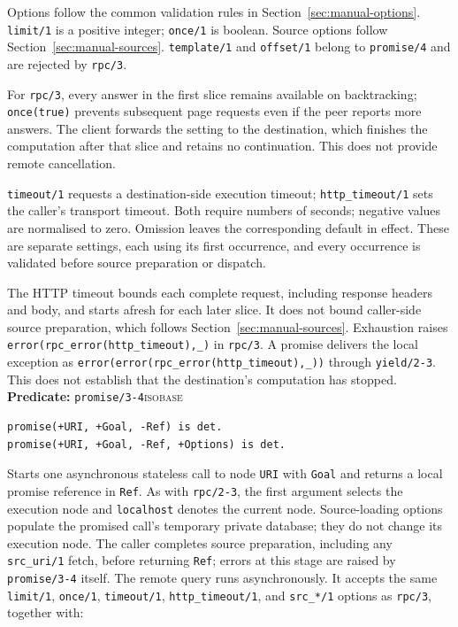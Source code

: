 Options follow the common validation rules in Section~\ref{sec:manual-options}. \texttt{limit/\allowbreak{}1} is a positive integer; \texttt{once/\allowbreak{}1}
is boolean. Source options follow Section~\ref{sec:manual-sources}. \texttt{template/\allowbreak{}1} and
\texttt{offset/\allowbreak{}1} belong to \texttt{promise/\allowbreak{}4} and are rejected by \texttt{rpc/\allowbreak{}3}.

For \texttt{rpc/\allowbreak{}3}, every answer in the first slice remains
available on backtracking; \texttt{once(true)} prevents subsequent page
requests even if the peer reports more answers. The client forwards the
setting to the destination, which finishes the computation after that slice
and retains no continuation. This does not provide remote cancellation.

\texttt{timeout/\allowbreak{}1} requests a destination-side execution timeout;
\texttt{http\_\allowbreak{}timeout/\allowbreak{}1} sets the caller's transport
timeout. Both require numbers of seconds; negative values are normalised to
zero. Omission leaves the corresponding default in effect. These are separate
settings, each using its first occurrence, and every occurrence is validated
before source preparation or dispatch.

The HTTP timeout bounds each complete request, including response headers and
body, and starts afresh for each later slice. It does not bound caller-side
source preparation, which follows Section~\ref{sec:manual-sources}. Exhaustion
raises \texttt{error(rpc\_error(http\_timeout),\_)} in \texttt{rpc/3}. A promise
delivers the local exception as
\texttt{error(error(rpc\_error(http\_timeout),\_))} through \texttt{yield/2-3}.
This does not establish that the destination's computation has stopped.\\

\noindent \textbf{Predicate:} \texttt{promise/\allowbreak{}3-4}\hfill\textsc{isobase}

\begin{verbatim}
promise(+URI, +Goal, -Ref) is det.
promise(+URI, +Goal, -Ref, +Options) is det.
\end{verbatim}

\noindent Starts one asynchronous stateless call to node \texttt{URI} with
\texttt{Goal} and returns a local promise reference in \texttt{Ref}. As with
\texttt{rpc/\allowbreak{}2-3}, the first argument selects the execution node and
\texttt{localhost} denotes the current node. Source-loading options populate
the promised call's temporary private database; they do not change its
execution node. The caller completes source
preparation, including any \texttt{src\_\allowbreak{}uri/\allowbreak{}1} fetch, before returning
\texttt{Ref}; errors at this stage are raised by \texttt{promise/\allowbreak{}3-4}
itself. The remote query runs asynchronously. It accepts the same \texttt{limit/\allowbreak{}1}, \texttt{once/\allowbreak{}1},
\texttt{timeout/\allowbreak{}1}, \texttt{http\_\allowbreak{}timeout/\allowbreak{}1}, and \texttt{src\_\allowbreak{}*/\allowbreak{}1} options as
\texttt{rpc/\allowbreak{}3}, together with:

